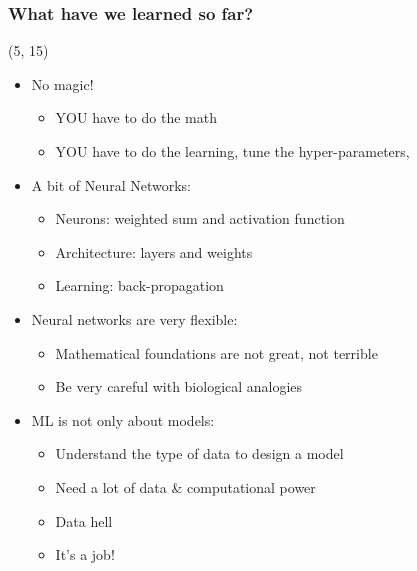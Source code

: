 \begin{frame}
  \frametitle{What have we learned so far?}

  \begin{textblock}{90}(5, 15)
    \begin{itemize}
    \item<1-> No magic!
      \begin{itemize}
      \item YOU have to do the math
      \item YOU have to do the learning, tune the hyper-parameters, \etc{}
      \end{itemize}
    \item<2-> A bit of Neural Networks:
      \begin{itemize}
      \item Neurons: weighted sum and activation function
      \item Architecture: layers and weights
      \item Learning: back-propagation
      \end{itemize}
    \item<3-> Neural networks are very flexible:
      \begin{itemize}
      \item Mathematical foundations are not great, not terrible
      \item Be very careful with biological analogies
      \end{itemize}
    \item<4-> \ac{ML} is not only about models:
      \begin{itemize}
      \item Understand the type of data to design a model
      \item Need a lot of data \& computational power
      \item Data hell
      \item It's a job!
      \end{itemize}
    \end{itemize}
  \end{textblock}
\end{frame}
